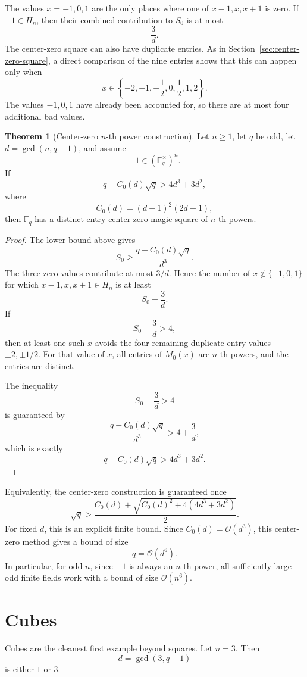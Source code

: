 \documentclass{article}
\newcommand{\mc}{\mathcal}
\newcommand{\F}{\mathbb F}
\theoremstyle{definition}
\newtheorem{theorem}{Theorem}
\numberwithin{equation}{section}
\begin{document}
The values \(x=-1,0,1\) are the only places where one of
\(x-1,x,x+1\) is zero.  If \(-1\in H_n\), then their combined contribution to
\(S_0\) is at most
\[
\frac{3}{d}.
\]
The center-zero square can also have duplicate entries.  As in Section~\ref{sec:center-zero-square}, a
direct comparison of the nine entries shows that this can happen only when
\[
x\in\left\{-2,-1,-\frac12,0,\frac12,1,2\right\}.
\]
The values \(-1,0,1\) have already been accounted for, so there are at most four
additional bad values.

\begin{theorem}[Center-zero \(n\)-th power construction]
\label{center-zero-nth-power}
Let \(n\geq1\), let \(q\) be odd, let \(d=\gcd(n,q-1)\), and assume
\[
-1\in (\F_q^\times)^n.
\]
If
\[
q-C_0(d)\sqrt q>4d^3+3d^2,
\]
where
\[
C_0(d)=(d-1)^2(2d+1),
\]
then \(\F_q\) has a distinct-entry center-zero magic square of \(n\)-th powers.
\end{theorem}

\begin{proof}
The lower bound above gives
\[
S_0\geq \frac{q-C_0(d)\sqrt q}{d^3}.
\]
The three zero values contribute at most \(3/d\).  Hence the number of
\(x\notin\{-1,0,1\}\) for which \(x-1,x,x+1\in H_n\) is at least
\[
S_0-\frac{3}{d}.
\]
If
\[
S_0-\frac{3}{d}>4,
\]
then at least one such \(x\) avoids the four remaining duplicate-entry values
\(\pm2,\pm1/2\).  For that value of \(x\), all entries of \(M_0(x)\) are
\(n\)-th powers, and the entries are distinct.

The inequality
\[
S_0-\frac{3}{d}>4
\]
is guaranteed by
\[
\frac{q-C_0(d)\sqrt q}{d^3}>4+\frac{3}{d},
\]
which is exactly
\[
q-C_0(d)\sqrt q>4d^3+3d^2.
\]
\end{proof}

Equivalently, the center-zero construction is guaranteed once
\[
\sqrt q>
\frac{C_0(d)+\sqrt{C_0(d)^2+4(4d^3+3d^2)}}{2}.
\]
For fixed \(d\), this is an explicit finite bound.  Since
\(C_0(d)=\mc{O}(d^3)\), this center-zero method gives a bound of size
\[
q=\mc{O}(d^6).
\]
In particular, for odd \(n\), since \(-1\) is always an \(n\)-th power, all
sufficiently large odd finite fields work with a bound of size \(\mc{O}(n^6)\).

\section{Cubes}

Cubes are the cleanest first example beyond squares.  Let \(n=3\).  Then
\[
d=\gcd(3,q-1)
\]
is either \(1\) or \(3\).
\end{document}
